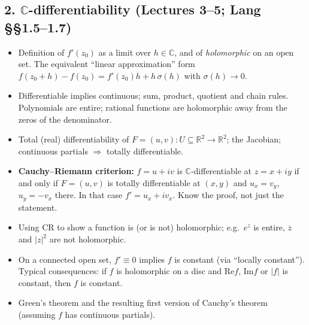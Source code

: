 \documentclass[12pt, reqno]{amsart}
\theoremstyle{definition}
\numberwithin{equation}{subsection}
\newcommand{\C}{\mathbb{C}}
\newcommand{\R}{\mathbb{R}}
\newcommand{\ov}[1]{\overline{#1}}
\renewcommand{\Re}{\mathrm{Re}}
\renewcommand{\Im}{\mathrm{Im}}
\begin{document}
\subsection*{2. $\C$-differentiability \normalfont (Lectures 3--5; Lang \S\S1.5--1.7)}
\begin{itemize}[leftmargin=*]
\item Definition of $f'(z_0)$ as a limit over $h\in\C$, and of \emph{holomorphic} on an open set.
      The equivalent ``linear approximation'' form $f(z_0+h)-f(z_0)=f'(z_0)h+h\,\sigma(h)$ with $\sigma(h)\to0$.
\item Differentiable implies continuous; sum, product, quotient and chain rules.
      Polynomials are entire; rational functions are holomorphic away from the zeros of the denominator.
\item Total (real) differentiability of $F=(u,v):U\subseteq\R^2\to\R^2$; the Jacobian;
      continuous partials $\Rightarrow$ totally differentiable.
\item \textbf{Cauchy--Riemann criterion:} $f=u+iv$ is $\C$-differentiable at $z=x+iy$ if and only if
      $F=(u,v)$ is totally differentiable at $(x,y)$ and $u_x=v_y$, $u_y=-v_x$ there.
      In that case $f'=u_x+iv_x$. Know the proof, not just the statement.
\item Using CR to show a function is (or is not) holomorphic; e.g.\ $e^z$ is entire, $\ov z$ and $|z|^2$ are not holomorphic.
\item On a connected open set, $f'\equiv0$ implies $f$ is constant (via ``locally constant'').
      Typical consequences: if $f$ is holomorphic on a disc and $\Re f$, $\Im f$ or $|f|$ is constant, then $f$ is constant.
\item Green's theorem and the resulting first version of Cauchy's theorem
      (assuming $f$ has continuous partials).
\end{itemize}
\end{document}
